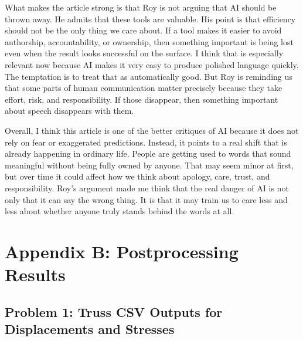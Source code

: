 \documentclass{article}
\begin{document}
What makes the article strong is that Roy is not arguing that AI should be thrown away. He admits that these tools are valuable. His point is that efficiency should not be the only thing we care about. If a tool makes it easier to avoid authorship, accountability, or ownership, then something important is being lost even when the result looks successful on the surface. I think that is especially relevant now because AI makes it very easy to produce polished language quickly. The temptation is to treat that as automatically good. But Roy is reminding us that some parts of human communication matter precisely because they take effort, risk, and responsibility. If those disappear, then something important about speech disappears with them.

Overall, I think this article is one of the better critiques of AI because it does not rely on fear or exaggerated predictions. Instead, it points to a real shift that is already happening in ordinary life. People are getting used to words that sound meaningful without being fully owned by anyone. That may seem minor at first, but over time it could affect how we think about apology, care, trust, and responsibility. Roy’s argument made me think that the real danger of AI is not only that it can say the wrong thing. It is that it may train us to care less and less about whether anyone truly stands behind the words at all.

\clearpage
\appendix
\label{sec:appB}
\section*{Appendix B: Postprocessing Results}

\subsection*{Problem 1: Truss CSV Outputs for Displacements and Stresses}
\end{document}
